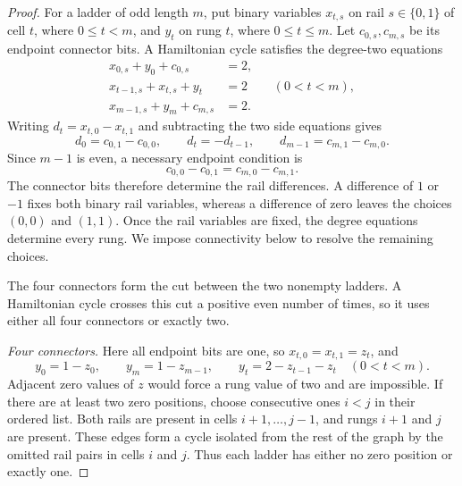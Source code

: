 \begin{proof}
For a ladder of odd length \(m\), put binary variables \(x_{t,s}\) on rail
\(s\in\{0,1\}\) of cell \(t\), where \(0\le t<m\), and \(y_t\) on rung
\(t\), where \(0\le t\le m\).  Let \(c_{0,s},c_{m,s}\) be its endpoint
connector bits.  A Hamiltonian cycle satisfies the degree-two equations
\begin{align}
 x_{0,s}+y_0+c_{0,s}&=2,\label{eq:ladder-left-degree}\\
 x_{t-1,s}+x_{t,s}+y_t&=2 &&(0<t<m),\label{eq:ladder-inner-degree}\\
 x_{m-1,s}+y_m+c_{m,s}&=2.\label{eq:ladder-right-degree}
\end{align}
Writing \(d_t=x_{t,0}-x_{t,1}\) and subtracting the two side equations gives
\[
 d_0=c_{0,1}-c_{0,0},\qquad d_t=-d_{t-1},\qquad
 d_{m-1}=c_{m,1}-c_{m,0}.
\]
Since \(m-1\) is even, a necessary endpoint condition is
\begin{equation}
\label{eq:ladder-endpoint-compatibility}
 c_{0,0}-c_{0,1}=c_{m,0}-c_{m,1}.
\end{equation}
The connector bits therefore determine the rail differences.  A difference
of \(1\) or \(-1\) fixes both binary rail variables, whereas a difference
of zero leaves the choices \((0,0)\) and \((1,1)\).  Once the rail variables
are fixed, the degree equations determine every rung.  We impose connectivity
below to resolve the remaining choices.

The four connectors form the cut between the two nonempty ladders.  A
Hamiltonian cycle crosses this cut a positive even number of times, so it
uses either all four connectors or exactly two.

\smallskip\noindent\emph{Four connectors.}
Here all endpoint bits are one, so \(x_{t,0}=x_{t,1}=z_t\), and
\[
 y_0=1-z_0,\qquad y_m=1-z_{m-1},\qquad
 y_t=2-z_{t-1}-z_t\quad(0<t<m).
\]
Adjacent zero values of \(z\) would force a rung value of two and are
impossible.  If there are at least two zero positions, choose consecutive
ones \(i<j\) in their ordered list.  Both rails are present in cells
\(i+1,\ldots,j-1\), and rungs \(i+1\) and \(j\) are present.  These edges
form a cycle isolated from the rest of the graph by the omitted rail pairs
in cells \(i\) and \(j\).  Thus each ladder has either no zero position or
exactly one.


\end{proof}
